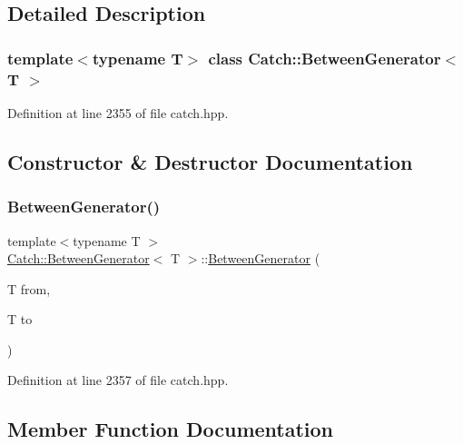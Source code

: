\subsection{Detailed Description}
\subsubsection*{template$<$typename T$>$\newline
class Catch\+::\+Between\+Generator$<$ T $>$}



Definition at line 2355 of file catch.\+hpp.



\subsection{Constructor \& Destructor Documentation}
\hypertarget{class_catch_1_1_between_generator_a835a057d691ae37caef660624099b51c}{}\label{class_catch_1_1_between_generator_a835a057d691ae37caef660624099b51c} 
\subsubsection{\texorpdfstring{Between\+Generator()}{BetweenGenerator()}}
{\footnotesize\ttfamily template$<$typename T $>$ \\
\hyperlink{class_catch_1_1_between_generator}{Catch\+::\+Between\+Generator}$<$ T $>$\+::\hyperlink{class_catch_1_1_between_generator}{Between\+Generator} (\begin{DoxyParamCaption}\item[{T}]{from,  }\item[{T}]{to }\end{DoxyParamCaption})\hspace{0.3cm}{\ttfamily [inline]}}



Definition at line 2357 of file catch.\+hpp.



\subsection{Member Function Documentation}
\hypertarget{class_catch_1_1_between_generator_a913f74bb0c23b3bc0127abfffdabbd94}{}\label{class_catch_1_1_between_generator_a913f74bb0c23b3bc0127abfffdabbd94} 
